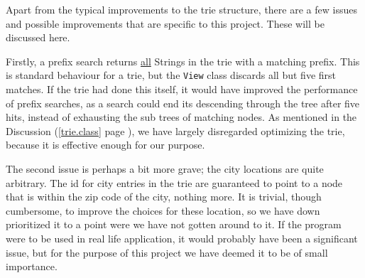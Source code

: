 Apart from the typical improvements to the trie structure, there are a few issues and possible improvements that are specific to this project. These will be discussed here.

Firstly, a prefix search returns \underline{all} Strings in the trie with a matching prefix.
This is standard behaviour for a trie, but the \texttt{View} class discards all but five first matches. If the trie had done this itself, it would have improved the performance of prefix searches, as a search could end its descending through the tree after five hits, instead of exhausting the sub trees of matching nodes. As mentioned in the Discussion (\ref{trie.class} page \pageref{trie.class}),
we have largely disregarded optimizing the trie, because it is effective enough for our purpose.

The second issue is perhaps a bit more grave; the city locations are quite arbitrary.
The id for city entries in the trie are guaranteed to point to a node that is within the zip code of the city, nothing more. It is trivial, though cumbersome, to improve the choices for these location, so we have down prioritized it to a point were we have not gotten around to it.
If the program were to be used in real life application, it would probably have been a significant issue, but for the purpose of this project we have deemed it to be of small importance.
